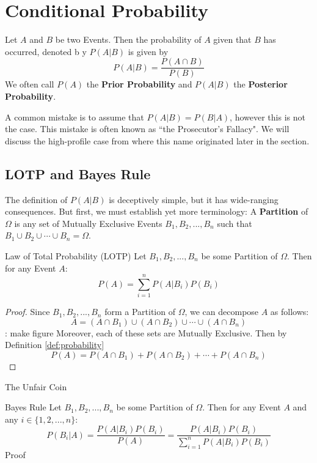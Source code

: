 \documentclass{report}
\begin{document}
\section{Conditional Probability}
Let $A$ and $B$ be two Events. Then the probability of $A$ given that $B$ has occurred, denoted b y $P(A\vert B)$ is given by
\[
    P(A\vert B)=\frac{P(A\cap B)}{P(B)}
\]
We often call $P(A)$ the \textbf{Prior Probability} and $P(A\vert B)$ the \textbf{Posterior Probability}.
\begin{notsofast}
    A common mistake is to assume that $P(A\vert B)=P(B\vert A)$, however this is not the case. This mistake is often known as ``the Prosecutor's Fallacy". We will discuss the high-profile case from where this name originated later in the section.
\end{notsofast}

\subsection{LOTP and Bayes Rule}
The definition of $P(A\vert B)$ is deceptively simple, but it has wide-ranging consequences. But first, we must establish yet more terminology: A \textbf{Partition} of $\Omega$ is any set of Mutually Exclusive Events $B_1,B_2,...,B_n$ such that $B_1\cup B_2\cup\cdots \cup B_n=\Omega$.

\begin{theorem}{Law of Total Probability (LOTP)}
Let $B_1,B_2,...,B_n$ be some Partition of $\Omega$. Then for any Event $A$:
\[
    P(A)=\sum_{i=1}^n P(A\vert B_i) P(B_i)
\]
\tcblower
\begin{proof}
    Since $B_1,B_2,...,B_n$ form a Partition of $\Omega$, we can decompose $A$ as follows:
    \[
        A=(A\cap B_1)\cup (A\cap B_2) \cup \cdots \cup (A\cap B_n)
    \]
    \todo: make figure
    Moreover, each of these sets are Mutually Exclusive. Then by Definition \ref{def:probability}
    \[
        P(A)=P(A\cap B_1)+ P(A\cap B_2)+ \cdots + P(A\cap B_n)
    \]
\end{proof}
\end{theorem}

\begin{example}{The Unfair Coin}
    \todo
\end{example}

\begin{theorem}{Bayes Rule}
    Let $B_1,B_2,...,B_n$ be some Partition of $\Omega$. Then for any Event $A$ and any $i\in \{1,2,...,n\}$:
    \[
        P(B_i\vert A) = \frac{P(A\vert B_i)P(B_i)}{P(A)}= \frac{P(A\vert B_i)P(B_i)}{\sum_{i=1}^n P(A|B_i)P(B_i)}
    \]
    \tcblower
    \todo Proof
\end{theorem}
\end{document}
